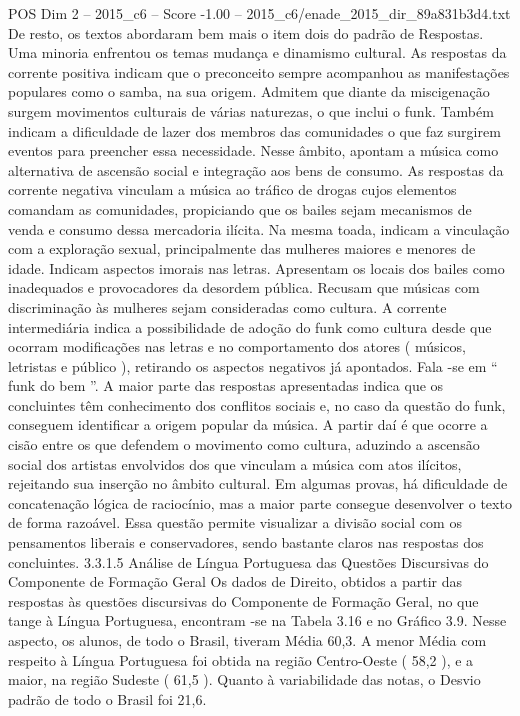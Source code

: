 \begin{textsample}{POS Dim 2 – 2015\_c6 – Score -1.00 – 2015\_c6/enade\_2015\_dir\_89a831b3d4.txt}
De resto, os textos abordaram bem mais o item dois do padrão de Respostas.
Uma minoria enfrentou os temas mudança e dinamismo cultural.
As respostas da corrente positiva indicam que o preconceito sempre acompanhou as manifestações populares como o samba, na sua origem.
Admitem que diante da miscigenação surgem movimentos culturais de várias naturezas, o que inclui o funk.
Também indicam a dificuldade de lazer dos membros das comunidades o que faz surgirem eventos para preencher essa necessidade.
Nesse âmbito, apontam a música como alternativa de ascensão social e integração aos bens de consumo.
As respostas da corrente negativa vinculam a música ao tráfico de drogas cujos elementos comandam as comunidades, propiciando que os bailes sejam mecanismos de venda e consumo dessa mercadoria ilícita.
Na mesma toada, indicam a vinculação com a exploração sexual, principalmente das mulheres maiores e menores de idade.
Indicam aspectos imorais nas letras.
Apresentam os locais dos bailes como inadequados e provocadores da desordem pública.
Recusam que músicas com discriminação às mulheres sejam consideradas como cultura.
A corrente intermediária indica a possibilidade de adoção do funk como cultura desde que ocorram modificações nas letras e no comportamento dos atores ( músicos, letristas e público ), retirando os aspectos negativos já apontados.
Fala -se em “ funk do bem ”.
A maior parte das respostas apresentadas indica que os concluintes têm conhecimento dos conflitos sociais e, no caso da questão do funk, conseguem identificar a origem popular da música.
A partir daí é que ocorre a cisão entre os que defendem o movimento como cultura, aduzindo a ascensão social dos artistas envolvidos dos que vinculam a música com atos ilícitos, rejeitando sua inserção no âmbito cultural.
Em algumas provas, há dificuldade de concatenação lógica de raciocínio, mas a maior parte consegue desenvolver o texto de forma razoável.
Essa questão permite visualizar a divisão social com os pensamentos liberais e conservadores, sendo bastante claros nas respostas dos concluintes. 3.3.1.5 Análise de Língua Portuguesa das Questões Discursivas do Componente de Formação Geral Os dados de Direito, obtidos a partir das respostas às questões discursivas do Componente de Formação Geral, no que tange à Língua Portuguesa, encontram -se na Tabela 3.16 e no Gráfico 3.9.
Nesse aspecto, os alunos, de todo o Brasil, tiveram Média 60,3.
A menor Média com respeito à Língua Portuguesa foi obtida na região Centro-Oeste ( 58,2 ), e a maior, na região Sudeste ( 61,5 ).
Quanto à variabilidade das notas, o Desvio padrão de todo o Brasil foi 21,6.

\end{textsample}

